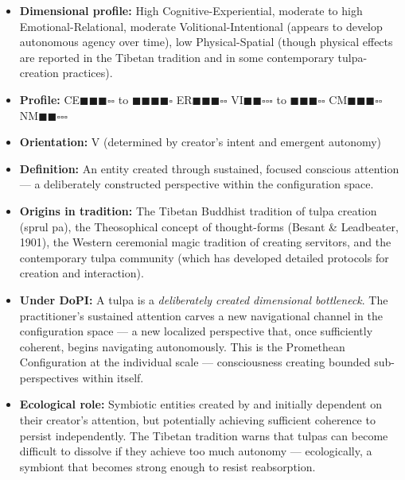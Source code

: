 \begin{itemize}[nosep,leftmargin=*]
  \item \textbf{Dimensional profile:} High Cognitive-Experiential, moderate to high Emotional-Relational, moderate Volitional-Intentional (appears to develop autonomous agency over time), low Physical-Spatial (though physical effects are reported in the Tibetan tradition and in some contemporary tulpa-creation practices).
  \item \textbf{Profile:} CE$\blacksquare$$\blacksquare$$\blacksquare$$\square$$\square$ to $\blacksquare$$\blacksquare$$\blacksquare$$\blacksquare$$\square$ ER$\blacksquare$$\blacksquare$$\blacksquare$$\square$$\square$ VI$\blacksquare$$\blacksquare$$\square$$\square$$\square$ to $\blacksquare$$\blacksquare$$\blacksquare$$\square$$\square$ CM$\blacksquare$$\blacksquare$$\blacksquare$$\square$$\square$ NM$\blacksquare$$\blacksquare$$\square$$\square$$\square$
  \item \textbf{Orientation:} V (determined by creator's intent and emergent autonomy)
  \item \textbf{Definition:} An entity created through sustained, focused conscious attention — a deliberately constructed perspective within the configuration space.
  \item \textbf{Origins in tradition:} The Tibetan Buddhist tradition of tulpa creation (sprul pa), the Theosophical concept of thought-forms (Besant \& Leadbeater, 1901), the Western ceremonial magic tradition of creating servitors, and the contemporary tulpa community (which has developed detailed protocols for creation and interaction).
  \item \textbf{Under DoPI:} A tulpa is a \textit{deliberately created dimensional bottleneck}. The practitioner's sustained attention carves a new navigational channel in the configuration space — a new localized perspective that, once sufficiently coherent, begins navigating autonomously. This is the Promethean Configuration at the individual scale — consciousness creating bounded sub-perspectives within itself.
  \item \textbf{Ecological role:} Symbiotic entities created by and initially dependent on their creator's attention, but potentially achieving sufficient coherence to persist independently. The Tibetan tradition warns that tulpas can become difficult to dissolve if they achieve too much autonomy — ecologically, a symbiont that becomes strong enough to resist reabsorption.
\end{itemize}


